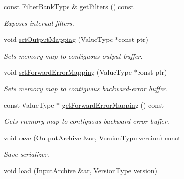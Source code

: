 \begin{DoxyCompactItemize}
const \hyperlink{classffnn_1_1layer_1_1_convolution_volume_a73cb805b7ffa2bc96461412e1cf958f9}{Filter\-Bank\-Type} \& \hyperlink{classffnn_1_1layer_1_1_convolution_volume_a9c0858bc9ec53071a5d0eb083772d9ac}{get\-Filters} () const 
\begin{DoxyCompactList}\small\item\em Exposes internal filters. \end{DoxyCompactList}\item 
void \hyperlink{classffnn_1_1layer_1_1_convolution_volume_abf9ca7c7901a909ee924f3bca9e1f4cd}{set\-Output\-Mapping} (Value\-Type $\ast$const ptr)
\begin{DoxyCompactList}\small\item\em Sets memory map to contiguous output buffer. \end{DoxyCompactList}\item 
void \hyperlink{classffnn_1_1layer_1_1_convolution_volume_a089d53d3244e88f9220ed465b0f1d80e}{set\-Forward\-Error\-Mapping} (Value\-Type $\ast$const ptr)
\begin{DoxyCompactList}\small\item\em Sets memory map to contiguous backward-\/error buffer. \end{DoxyCompactList}\item 
const Value\-Type $\ast$ \hyperlink{classffnn_1_1layer_1_1_convolution_volume_a70c050c2f7ad88186b3e6cd325567a84}{get\-Forward\-Error\-Mapping} () const 
\begin{DoxyCompactList}\small\item\em Gets memory map to contiguous backward-\/error buffer. \end{DoxyCompactList}\item 
void \hyperlink{classffnn_1_1layer_1_1_convolution_volume_a52d21f4ee6b841d154b1dc63bd3ed4bf}{save} (\hyperlink{classffnn_1_1traits_1_1_serializable_a08d986df75d363fa79506d4f6045cb9f}{Output\-Archive} \&ar, \hyperlink{classffnn_1_1traits_1_1_serializable_a08924b3b7d20cb3cb6eafe517d4f7b30}{Version\-Type} version) const 
\begin{DoxyCompactList}\small\item\em Save serializer. \end{DoxyCompactList}\item 
void \hyperlink{classffnn_1_1layer_1_1_convolution_volume_a77f5965e61f450d0fe72fa091a3e667a}{load} (\hyperlink{classffnn_1_1traits_1_1_serializable_a6e626759259f8f370dd4303b4441a234}{Input\-Archive} \&ar, \hyperlink{classffnn_1_1traits_1_1_serializable_a08924b3b7d20cb3cb6eafe517d4f7b30}{Version\-Type} version)

\end{DoxyCompactItemize}

